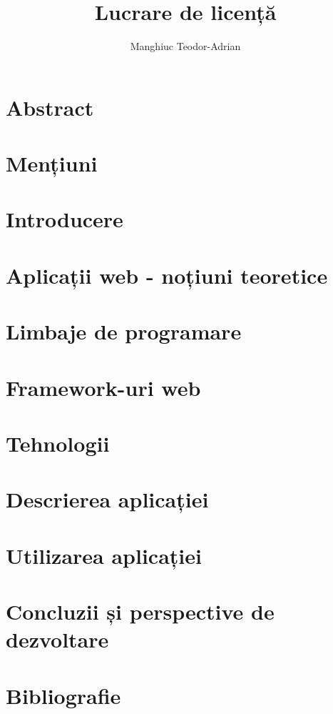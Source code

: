 \documentclass[12pt, twoside]{report}
\title{Lucrare de licență}
\author{Manghiuc Teodor-Adrian}
\date{}
\begin{document}
	
	
	\chapter*{Abstract}
	
	
	\chapter*{Mențiuni}
	
	
	\tableofcontents
	
	\chapter{Introducere}
	
	
	\chapter{Aplicații web - noțiuni teoretice}
	
	
	\chapter{Limbaje de programare}
	
	
	\chapter{Framework-uri web}
	
	
	\chapter{Tehnologii}
	
	
	\chapter{Descrierea aplicației}
	
	
	\chapter{Utilizarea aplicației}
	
	
	\chapter{Concluzii și perspective de dezvoltare}
	
	
	\chapter{Bibliografie}
	
	
\end{document}
